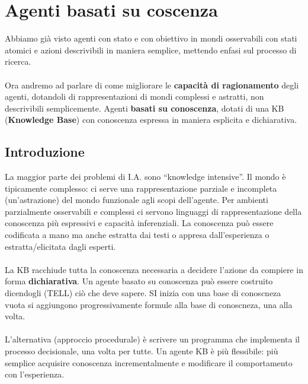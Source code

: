 \newpage
\section{Agenti basati su coscenza}
Abbiamo già visto agenti con stato e con obiettivo in mondi osservabili con stati atomici e azioni descrivibili
in maniera semplice, mettendo enfasi sul processo di ricerca.\\\\
Ora andremo ad parlare di come migliorare le \textbf{capacità di ragionamento} degli agenti,
dotandoli di rappresentazioni di mondi complessi e astratti, non descrivibili semplicemente.
Agenti \textbf{basati su conoscenza}, dotati di una KB (\textbf{Knowledge Base}) con conoscenza espressa in maniera esplicita e dichiarativa.
\subsection{Introduzione}
La maggior parte dei problemi di I.A. sono “knowledge intensive”. Il mondo è tipicamente complesso: ci serve una rappresentazione
parziale e incompleta (un’astrazione) del mondo funzionale agli scopi dell’agente. Per ambienti parzialmente osservabili e complessi ci servono
linguaggi di rappresentazione della conoscenza più espressivi e capacità inferenziali. La conoscenza può essere codificata a mano ma anche estratta dai
testi o appresa dall’esperienza o estratta/elicitata dagli esperti.\\\\
La KB racchiude tutta la conoscenza necessaria a decidere l’azione da compiere in forma \textbf{dichiarativa}.
Un agente basato su conoscenza può essere costruito dicendogli (TELL) ciò che deve sapere. SI inizia con una base di conoscneza vuota
si aggiungono progressivamente formule alla base di conoscneza, una alla volta.\\\\
L’alternativa (approccio procedurale) è scrivere un programma che implementa il processo decisionale, una
volta per tutte. Un agente KB è più flessibile: più semplice acquisire conoscenza incrementalmente e modificare il
comportamento con l’esperienza.
